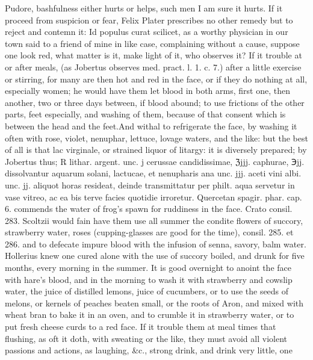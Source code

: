 Pudore, bashfulness either hurts or helps, such men I am sure it hurts.
If it proceed from suspicion or fear, Felix Plater prescribes no
other remedy but to reject and contemn it: Id populus curat scilicet,
as a worthy physician in our town said to a friend of mine in
like case, complaining without a cause, suppose one look red, what
matter is it, make light of it, who observes it?
If it trouble at or after meals, (as Jobertus observes med.
pract. l. 1. c. 7.) after a little exercise or stirring, for many are
then hot and red in the face, or if they do nothing at all, especially
women; he would have them let blood in both arms, first one, then
another, two or three days between, if blood abound; to use frictions
of the other parts, feet especially, and washing of them, because of
that consent which is between the head and the feet.And withal to
refrigerate the face, by washing it often with rose, violet, nenuphar,
lettuce, lovage waters, and the like: but the best of all is that lac
virginale, or strained liquor of litargy: it is diversely prepared; by
Jobertus thus; ℞ lithar. argent. unc. j cerussae candidissimae, ℨjjj.
caphurae, ℈jj. dissolvantur aquarum solani, lactucae, et nenupharis ana
unc. jjj. aceti vini albi. unc. jj. aliquot horas resideat, deinde
transmittatur per philt. aqua servetur in vase vitreo, ac ea bis terve
facies quotidie irroretur. Quercetan spagir. phar. cap. 6.
commends the water of frog's spawn for ruddiness in the face.
Crato consil. 283. Scoltzii would fain have them use all summer
the condite flowers of succory, strawberry water, roses
(cupping-glasses are good for the time), consil. 285. et 286. and to
defecate impure blood with the infusion of senna, savory, balm water.
Hollerius knew one cured alone with the use of succory boiled,
and drunk for five months, every morning in the summer. It is
good overnight to anoint the face with hare's blood, and in the morning
to wash it with strawberry and cowslip water, the juice of distilled
lemons, juice of cucumbers, or to use the seeds of melons, or kernels
of peaches beaten small, or the roots of Aron, and mixed with wheat
bran to bake it in an oven, and to crumble it in strawberry water,
 or to put fresh cheese curds to a red face.
If it trouble them at meal times that flushing, as oft it doth, with
sweating or the like, they must avoid all violent passions and actions,
as laughing, \&c., strong drink, and drink very little, one
